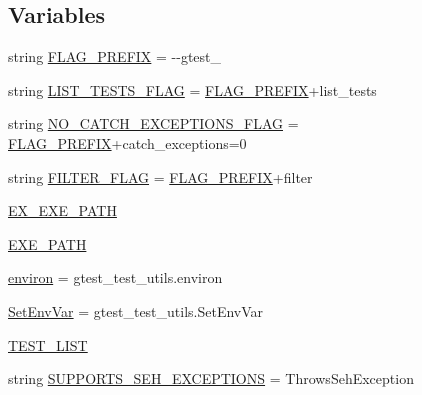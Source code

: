 \subsection*{Variables}
\begin{DoxyCompactItemize}
\item 
string \hyperlink{namespacegtest__catch__exceptions__test_a2d40f89077ec9fdb51008c263148315f}{F\+L\+A\+G\+\_\+\+P\+R\+E\+F\+IX} = \textquotesingle{}-\/-\/gtest\+\_\+\textquotesingle{}
\item 
string \hyperlink{namespacegtest__catch__exceptions__test_a68601cbcd48065a2f656eb8552784f0c}{L\+I\+S\+T\+\_\+\+T\+E\+S\+T\+S\+\_\+\+F\+L\+AG} = \hyperlink{namespacegtest__catch__exceptions__test_a2d40f89077ec9fdb51008c263148315f}{F\+L\+A\+G\+\_\+\+P\+R\+E\+F\+IX}+\textquotesingle{}list\+\_\+tests\textquotesingle{}
\item 
string \hyperlink{namespacegtest__catch__exceptions__test_af3e2719448df6b24d78c870e5b586e8b}{N\+O\+\_\+\+C\+A\+T\+C\+H\+\_\+\+E\+X\+C\+E\+P\+T\+I\+O\+N\+S\+\_\+\+F\+L\+AG} = \hyperlink{namespacegtest__catch__exceptions__test_a2d40f89077ec9fdb51008c263148315f}{F\+L\+A\+G\+\_\+\+P\+R\+E\+F\+IX}+\textquotesingle{}catch\+\_\+exceptions=0\textquotesingle{}
\item 
string \hyperlink{namespacegtest__catch__exceptions__test_a1a53cfa4c10fe3bdbc85a14fd9692751}{F\+I\+L\+T\+E\+R\+\_\+\+F\+L\+AG} = \hyperlink{namespacegtest__catch__exceptions__test_a2d40f89077ec9fdb51008c263148315f}{F\+L\+A\+G\+\_\+\+P\+R\+E\+F\+IX}+\textquotesingle{}filter\textquotesingle{}
\item 
\hyperlink{namespacegtest__catch__exceptions__test_a2154a0f0c4c506089d686c1365d288be}{E\+X\+\_\+\+E\+X\+E\+\_\+\+P\+A\+TH}
\item 
\hyperlink{namespacegtest__catch__exceptions__test_a164e7815d55b13a811ce60e2e6f9448d}{E\+X\+E\+\_\+\+P\+A\+TH}
\item 
\hyperlink{namespacegtest__catch__exceptions__test_ae51b794c28e667016c180f1b3fc85292}{environ} = gtest\+\_\+test\+\_\+utils.\+environ
\item 
\hyperlink{namespacegtest__catch__exceptions__test_a60be14c2b88aafb689ba4d3d2578449e}{Set\+Env\+Var} = gtest\+\_\+test\+\_\+utils.\+Set\+Env\+Var
\item 
\hyperlink{namespacegtest__catch__exceptions__test_ac0cf90f54624335d1765e85cf6a74e21}{T\+E\+S\+T\+\_\+\+L\+I\+ST}
\item 
string \hyperlink{namespacegtest__catch__exceptions__test_a237f68d721da53e9fd4f83b07a1887e3}{S\+U\+P\+P\+O\+R\+T\+S\+\_\+\+S\+E\+H\+\_\+\+E\+X\+C\+E\+P\+T\+I\+O\+NS} = \textquotesingle{}Throws\+Seh\+Exception\textquotesingle{}

\end{DoxyCompactItemize}

